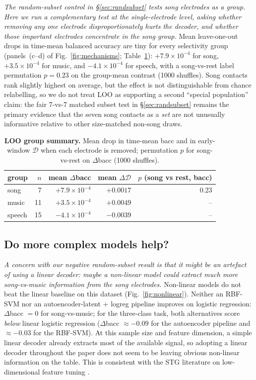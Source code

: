 \documentclass[11pt]{article}
\newcommand{\divg}{\mathcal{D}}
\begin{document}
\emph{The random-subset control in \S\ref{sec:randsubset} tests song electrodes as a group. Here we run a complementary test at the single-electrode level, asking whether removing any one electrode disproportionately hurts the decoder, and whether those important electrodes concentrate in the song group.} Mean leave-one-out drops in time-mean balanced accuracy are tiny for every selectivity group (panels~(c--d) of Fig.~\ref{fig:mechanisms}; Table~\ref{tab:loo}): $+7.9 \times 10^{-4}$ for song, $+3.5 \times 10^{-4}$ for music, and $-4.1 \times 10^{-4}$ for speech, with a song-vs-rest label permutation $p = 0.23$ on the group-mean contrast (1000 shuffles). Song contacts rank slightly highest on average, but the effect is not distinguishable from chance relabelling, so we do not treat LOO as supporting a second ``special population'' claim: the fair 7-vs-7 matched subset test in \S\ref{sec:randsubset} remains the primary evidence that the seven song contacts as a \emph{set} are not unusually informative relative to other size-matched non-song draws.

\begin{table}[t]
\centering\small
\caption{\textbf{LOO group summary.} Mean drop in time-mean bacc and in early-window $\divg$ when each electrode is removed; permutation $p$ for song-vs-rest on $\Delta$bacc (1000 shuffles).}
\label{tab:loo}
\begin{tabular}{lrrrr}
\toprule
group & $n$ & mean $\Delta$bacc & mean $\Delta\divg$ & $p$ (song vs rest, bacc) \\
\midrule
song   &  7 & $+7.9 \times 10^{-4}$ & $+0.0017$ & 0.23 \\
music  & 11 & $+3.5 \times 10^{-4}$ & $+0.0049$ & -- \\
speech & 15 & $-4.1 \times 10^{-4}$ & $-0.0039$ & -- \\
\bottomrule
\end{tabular}
\end{table}

\subsection{Do more complex models help?}

\emph{A concern with our negative random-subset result is that it might be an artefact of using a linear decoder: maybe a non-linear model could extract much more song-vs-music information from the song electrodes.} Non-linear models do not beat the linear baseline on this dataset (Fig.~\ref{fig:nonlinear}). Neither an RBF-SVM nor an autoencoder-latent + logreg pipeline improves on logistic regression: $\Delta$bacc $= 0$ for song-vs-music; for the three-class task, both alternatives score \emph{below} linear logistic regression ($\Delta$bacc $\approx -0.09$ for the autoencoder pipeline and $\approx -0.03$ for the RBF-SVM). At this sample size and feature dimension, a simple linear decoder already extracts most of the available signal, so adopting a linear decoder throughout the paper does not seem to be leaving obvious non-linear information on the table. This is consistent with the STG literature on low-dimensional feature tuning \citep{Mesgarani2014,Hullett2016}.
\end{document}
